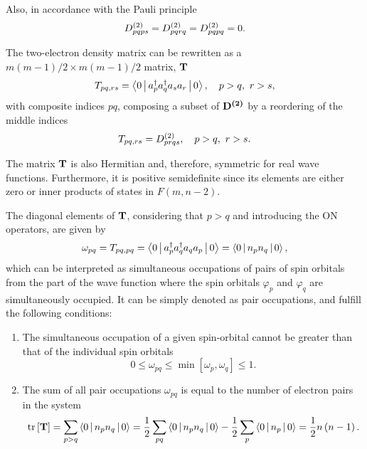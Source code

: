 Also, in accordance with the Pauli principle 
\begin{equation}
    D^{\left( 2 \right)}_{pqps} = D^{\left( 2 \right)}_{pqrq} = D^{\left( 2 \right)}_{pqpq} = 0
    .
\end{equation}

The two-electron density matrix can be rewritten as a
$m\left( m-1 \right) /2 \times m\left( m-1 \right) /2$ 
matrix, $ \boldsymbol{\mathrm{T}}$ 
\begin{equation}
    T_{pq,rs} = \Braket{0 | a_p^{\dagger} a_q^{\dagger} a_s a_r | 0}
    , \quad
    p>q,\ r>s
    ,
\end{equation}
with composite indices $pq$, composing a subset of $ \boldsymbol{\mathrm{D^{\left( 2 \right)}}}$ by a
reordering of the middle indices 
\begin{equation}
    T_{pq,rs} = D^{\left( 2 \right)}_{prqs}
    , \quad
    p>q,\ r>s
    .
\end{equation}

The matrix $ \boldsymbol{\mathrm{T}}$ is also Hermitian and, therefore, symmetric for real
wave functions.
Furthermore, it is positive semidefinite since its elements are either zero
or inner products of states in $F\left( m, n-2 \right)$.

The diagonal elements of $ \boldsymbol{\mathrm{T}}$, considering that $p > q$ and introducing
the ON operators, are given by
\begin{equation}
    \omega_{pq} = T_{pq,pq} =
    \Braket{0 | a_p^{\dagger} a_q^{\dagger} a_q a_p | 0} =
    \Braket{0 | n_p n_q | 0},
\end{equation}
which can be interpreted as simultaneous occupations of pairs of spin orbitals
from the part of the wave function where the spin
orbitals $\varphi_p$ and $\varphi_q$ are simultaneously occupied.
It can be simply denoted as pair occupations, and fulfill the following conditions:
\begin{enumerate}
    \item The simultaneous occupation of a given spin-orbital cannot be greater than that
        of the individual spin orbitals
        \begin{equation}
            0 \le \omega_{pq} \le \min\left[ \omega_p, \omega_q \right] \le 1
            .
        \end{equation}

    \item The sum of all pair occupations $\omega_{pq}$ is equal to the number of
        electron pairs in the system 
        \begin{equation}
            \trace \left[ \mat{T} \right] =
            \sum_{p>q} \Braket{0 | n_p n_q | 0} =
            \frac{1}{2} \sum_{pq} \Braket{0 | n_p n_q | 0}
            - \frac{1}{2} \sum_{p} \Braket{0 | n_p | 0} =
            \frac{1}{2} n \left( n - 1 \right)
            .
        \end{equation}
\end{enumerate}

